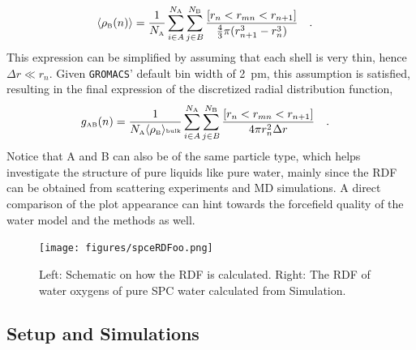 \documentclass[9pt,tutorial]{livecoms}
\begin{document}
\begin{align} \label{eq:rhoABn}
    \langle \rho_\text{\tiny B}(n) \rangle & = \frac{1}{N_\text{\tiny A}} \sum_{i \in A}^{N_\text{\tiny A}} \sum_{j \in B}^{N_\text{\tiny B}} \frac{\left[ r_n < r_{mn} < r_{n+1} \right]}{\frac{4}{3} \pi (r_{n+1}^3 - r_n^3)} \quad .
\end{align}
This expression can be simplified by assuming that each shell is very thin, hence $\Delta r \ll r_n$. Given \texttt{GROMACS}' default bin width of \SI{2}{\pico\meter}, this assumption is satisfied, resulting in the final expression of the discretized radial distribution function,
\begin{align} \label{eq:gABn}
    g_\text{\tiny AB}(n) & = \frac{1}{N_\text{\tiny A} \langle \rho_\text{\tiny B} \rangle \text{\tiny bulk} } \sum_{i \in A}^{N_\text{\tiny A}} \sum_{j \in B}^{N_\text{\tiny B}} \frac{\left[ r_n < r_{mn} < r_{n+1} \right]}{4\pi r_n^2 \Delta r} \quad .
\end{align}
Notice that A and B can also be of the same particle type, which helps investigate the structure of pure liquids like pure water, mainly since the RDF can be obtained from scattering experiments and MD simulations. A direct comparison of the plot appearance can hint towards the forcefield quality of the water model and the methods as well. 
\begin{figure}[H]
    \centering
    \texttt{[image: figures/spceRDFoo.png]}
    \caption[RDF-Schematic and RDF of SPCE Water]{Left: Schematic on how the RDF is calculated. Right: The RDF of water oxygens of pure SPC water calculated from Simulation.\cite{Berendsen1981}}
    \label{fig:rdf_spcwater}
\end{figure}


\subsection*{Setup and Simulations}
\end{document}
